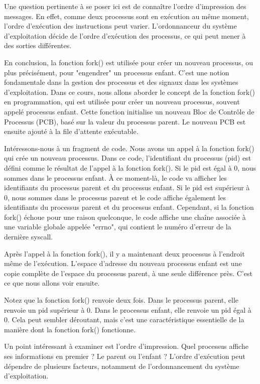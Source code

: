 \documentclass[12pt]{article}
\begin{document}
Une question pertinente à se poser ici est de connaître l'ordre d'impression des messages. En effet, comme deux processus sont en exécution au même moment, l'ordre d'exécution des instructions peut varier. L'ordonnanceur du système d'exploitation décide de l'ordre d'exécution des processus, ce qui peut mener à des sorties différentes.

En conclusion, la fonction fork() est utilisée pour créer un nouveau processus, ou plus précisément, pour "engendrer" un processus enfant. C'est une notion fondamentale dans la gestion des processus et des signaux dans les systèmes d'exploitation.
Dans ce cours, nous allons aborder le concept de la fonction fork() en programmation, qui est utilisée pour créer un nouveau processus, souvent appelé processus enfant. Cette fonction initialise un nouveau Bloc de Contrôle de Processus (PCB), basé sur la valeur du processus parent. Le nouveau PCB est ensuite ajouté à la file d'attente exécutable.

Intéressons-nous à un fragment de code. Nous avons un appel à la fonction fork() qui crée un nouveau processus. Dans ce code, l'identifiant du processus (pid) est défini comme le résultat de l'appel à la fonction fork(). Si le pid est égal à 0, nous sommes dans le processus enfant. À ce moment-là, le code va afficher les identifiants du processus parent et du processus enfant. Si le pid est supérieur à 0, nous sommes dans le processus parent et le code affiche également les identifiants du processus parent et du processus enfant. Cependant, si la fonction fork() échoue pour une raison quelconque, le code affiche une chaîne associée à une variable globale appelée "errno", qui contient le numéro d'erreur de la dernière syscall.

Après l'appel à la fonction fork(), il y a maintenant deux processus à l'endroit même de l'exécution. L'espace d'adresse du nouveau processus enfant est une copie complète de l'espace du processus parent, à une seule différence près. C'est ce que nous allons voir ensuite.

Notez que la fonction fork() renvoie deux fois. Dans le processus parent, elle renvoie un pid supérieur à 0. Dans le processus enfant, elle renvoie un pid égal à 0. Cela peut sembler déroutant, mais c'est une caractéristique essentielle de la manière dont la fonction fork() fonctionne.

Un point intéressant à examiner est l'ordre d'impression. Quel processus affiche ses informations en premier ? Le parent ou l'enfant ? L'ordre d'exécution peut dépendre de plusieurs facteurs, notamment de l'ordonnancement du système d'exploitation.
\end{document}
